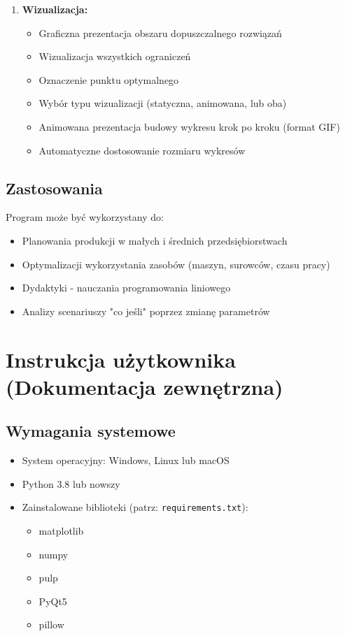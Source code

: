 \documentclass[12pt,a4paper]{article}
\begin{document}
\begin{enumerate}[label=\textbf{\arabic*.}]
    \item \textbf{Wizualizacja:}
    \begin{itemize}
        \item Graficzna prezentacja obszaru dopuszczalnego rozwiązań
        \item Wizualizacja wszystkich ograniczeń
        \item Oznaczenie punktu optymalnego
        \item Wybór typu wizualizacji (statyczna, animowana, lub oba)
        \item Animowana prezentacja budowy wykresu krok po kroku (format GIF)
        \item Automatyczne dostosowanie rozmiaru wykresów
    \end{itemize}
\end{enumerate}

\subsection{Zastosowania}

Program może być wykorzystany do:
\begin{itemize}
    \item Planowania produkcji w małych i średnich przedsiębiorstwach
    \item Optymalizacji wykorzystania zasobów (maszyn, surowców, czasu pracy)
    \item Dydaktyki - nauczania programowania liniowego
    \item Analizy scenariuszy "co jeśli" poprzez zmianę parametrów
\end{itemize}

\section{Instrukcja użytkownika (Dokumentacja zewnętrzna)}

\subsection{Wymagania systemowe}

\begin{itemize}
    \item System operacyjny: Windows, Linux lub macOS
    \item Python 3.8 lub nowszy
    \item Zainstalowane biblioteki (patrz: \texttt{requirements.txt}):
    \begin{itemize}
        \item matplotlib
        \item numpy
        \item pulp
        \item PyQt5
        \item pillow
    \end{itemize}
\end{itemize}
\end{document}
